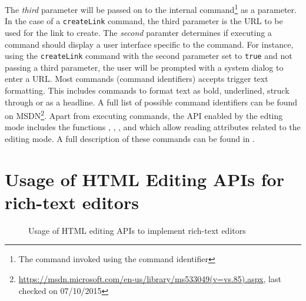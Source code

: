 The \textit{third} parameter will be passed on to the internal command\footnote{The command invoked using the command identifier} as a parameter. In the case of a \texttt{createLink} command, the third parameter is the URL to be used for the link to create. The \textit{second} paramter determines if executing a command should display a user interface specific to the command. For instance, using the \texttt{createLink} command with the second parameter set to \texttt{true} and not passing a third parameter, the user will be prompted with a system dialog to enter a URL. Most commands (command identifiers)  accepts trigger text formatting. This includes commands to format text as bold, underlined, struck through or as a headline. A full list of possible command identifiers can be found on MSDN\footnote{\url{https://msdn.microsoft.com/en-us/library/ms533049(v=vs.85).aspx}, last checked on 07/10/2015}. Apart from executing commands, the API enabled by the edting mode includes the functions , , ,  and  which allow reading attributes related to the editing mode. A full description of these commands can be found in .





\section{Usage of HTML Editing APIs for rich-text editors}
\label{sec:useage-of-html-editing-apis}

\begin{figure}[!htb]
\centering
{}
\caption{Usage of HTML editing APIs to implement rich-text editors}
\label{fig:formatting_dom_tree}
\end{figure}

